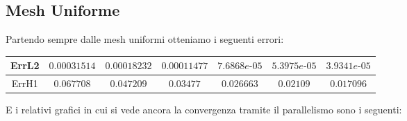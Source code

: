 \documentclass[12pt,a4paper]{report}
\theoremstyle{theorem}
\theoremstyle{theorem}
\theoremstyle{definition}
\begin{document}
\subsection{Mesh Uniforme}
Partendo sempre dalle mesh uniformi otteniamo i seguenti errori:
\begin{table}[!h]
\centering
\begin{tabular}{ | c | c | c | c | c | c | c | }
\hline
ErrL2	&	$0.00031514$ & $0.00018232$ & $0.00011477$ & $7.6868e\text{-}05$ & $5.3975e\text{-}05$ & $3.9341e\text{-}05$ \\ \hline 
ErrH1	&	$0.067708$ &	$0.047209$	 & $0.03477$	 & $0.026663$ & $0.02109$ & $0.017096$ \\ \hline 
\end{tabular}
\end{table}
E i relativi grafici in cui si vede ancora la convergenza tramite il parallelismo sono i seguenti:
\end{document}
